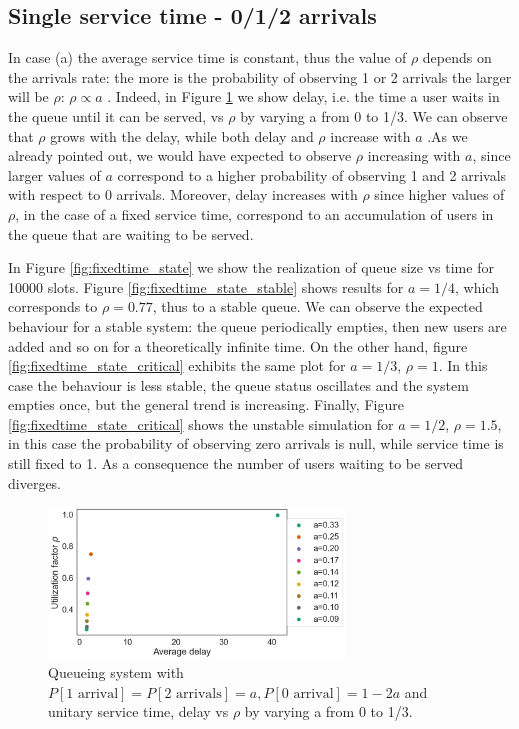 \documentclass[twoside,onecolumn]{article}
\theoremstyle{definition}
\begin{document}
\subsection{Single service time - 0/1/2 arrivals}
In case (a) the average service time is constant, thus the value of $\rho$ depends on the arrivals rate: the more is the probability of observing 1 or 2 arrivals the larger will be $\rho$:  $\rho\propto a$ . 
Indeed, in Figure \ref{fig:rho_fixedtime} we show delay, i.e. the time a user waits in the queue until it can be served, vs  $\rho$ by varying a from 0 to 1/3. We can observe that $\rho$ grows with the delay, while both delay and $\rho$ increase with $a$ .As we already pointed out, we would have expected to observe $\rho$ increasing with $a$, since larger values of $a$ correspond to a higher probability of observing 1 and 2 arrivals with respect to 0 arrivals. Moreover, delay increases with $\rho$ since higher values of $\rho$, in the case of a fixed service time, correspond to an accumulation of users in the queue that are waiting to be served.
\par
In Figure \ref{fig:fixedtime_state} we show the realization of queue size vs time for 10000 slots. Figure   \ref{fig:fixedtime_state_stable} shows results for $a=1/4$, which corresponds to $\rho = 0.77$, thus to a stable queue. We can observe the expected behaviour for a stable system: the queue periodically empties, then new users are added and so on for a theoretically infinite time. On the other hand, figure \ref{fig:fixedtime_state_critical} exhibits the same plot for $a=1/3$, $\rho = 1$. In this case the behaviour is less stable, the queue status oscillates and the system empties once, but the general trend is increasing. Finally,  Figure \ref{fig:fixedtime_state_critical} shows the unstable simulation for $a=1/2$, $\rho = 1.5$, in this case the probability of observing zero arrivals is null, while service time is still fixed to 1. As a consequence the number of users waiting to be served diverges. 

\begin{figure} \centering
         \includegraphics[width=0.7\textwidth]{../single_server_queue/figures/delay_vs_rho_fixedtime.png}
    \caption{Queueing system with  $P[\text{1 arrival}]=P[\text{2 arrivals}]=a, P[\text{0 arrival}]=1-2a$ and unitary service time, delay vs  $\rho$ by varying a from 0 to 1/3.  }\label{fig:rho_fixedtime}
\end{figure}
\end{document}
